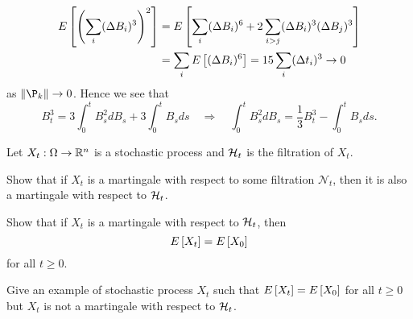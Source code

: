 \begin{solution}
\begin{equation*}
        \begin{split}
            E\sbrc{\pth{\sum_i (\Delta B_i)^3}^2} &= E\sbrc{\sum_i (\Delta B_i)^6 + 2\sum_{i>j} (\Delta B_i)^3(\Delta B_j)^3} \\
            &= \sum_i E\sbrc{(\Delta B_i)^6} = 15\sum_i (\Delta t_i)^3 \to 0
        \end{split}
    \end{equation*}
    as $\norm{\P_k}\to 0$. Hence we see that 
    \begin{equation*}
        B_t^3 = 3\int_0^t B_s^2dB_s + 3\int_0^t B_sds \quad \Rightarrow\quad
        \int_0^t B_s^2dB_s = \frac{1}{3}B_t^3 - \int_0^t B_sds.
    \end{equation*}
\end{solution}

\begin{exercise}{3.3}\label{ex:3.3}
    Let $X_t:\Omega\to\mathbb{R}^n$ is a stochastic process and $\mathcal{H}_t$ is the filtration of 
    $X_t$. 
    \begin{thmenum}
        \item Show that if $X_t$ is a martingale with respect to some filtration $\mathcal{N}_t$, 
        then it is also a martingale with respect to $\mathcal{H}_t$.
        \item Show that if $X_t$ is a martingale with respect to $\mathcal{H}_t$, then 
        \begin{equation*}
            E\left[ {X_t} \right] = E\left[ {X_0} \right]
        \end{equation*}
        for all $t\geq 0$. 
        \item Give an example of stochastic process $X_t$ such that $E\left[ {X_t} \right] = E\left[ {X_0} \right]$ for 
        all $t\geq 0$ but $X_t$ is not a martingale with respect to $\mathcal{H}_t$. 
    \end{thmenum}
\end{exercise}
